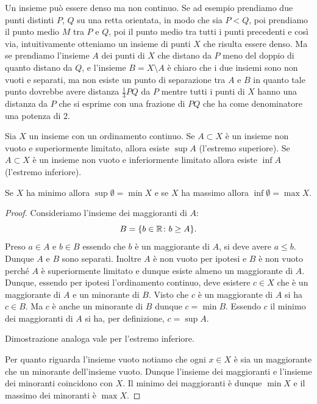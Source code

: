 \begin{example}
Un insieme può essere denso ma non continuo. 
Se ad esempio prendiamo due punti distinti $P$, $Q$ su una retta orientata, 
in modo che sia $P<Q$, poi prendiamo il punto 
medio $M$ tra $P$ e $Q$, poi il punto medio tra tutti i punti precedenti 
e così via,
intuitivamente otteniamo un insieme di punti $X$ che risulta essere denso.
Ma se prendiamo l'insieme $A$ dei punti di $X$ che distano da $P$ 
meno del doppio di quanto distano da $Q$, 
e l'insieme $B=X\setminus A$ è chiaro che i due insiemi sono non vuoti e 
separati, ma non esiste un punto di separazione tra $A$ e $B$ in quanto 
tale punto dovrebbe avere distanza $\frac 1 3 PQ$ da $P$ mentre tutti i punti 
di $X$ hanno una distanza da $P$ che si esprime con una frazione di $PQ$ 
che ha come denominatore una potenza di $2$.
\end{example}


\begin{theorem}%
  \label{th:sup}%
  \mymark{**}%
  Sia $X$ un insieme con un ordinamento continuo.
  Se $A\subset X$ è un insieme non vuoto
  e superiormente limitato, allora esiste $\sup A$ (l'estremo superiore).
  Se $A\subset X$ è un insieme non vuoto e inferiormente limitato 
  allora esiste $\inf A$ (l'estremo inferiore).

  Se $X$ ha minimo allora $\sup\emptyset = \min X$
  e se $X$ ha massimo allora $\inf\emptyset = \max X$.
  \end{theorem}
  \begin{proof}
  \mymark{*}
  Consideriamo l'insieme dei maggioranti di $A$:
  \[
  B = {\left\{  b\in {\mathbb R} \colon b \ge A \right\}}.
  \]
  Preso $a\in A$ e $b\in B$ essendo che $b$ è un maggiorante di $A$,
  si deve avere $a\le b$. Dunque $A$ e $B$ sono separati.
  Inoltre $A$ è non vuoto per ipotesi e $B$ è non vuoto perché 
  $A$ è superiormente limitato e dunque esiste almeno un maggiorante di $A$.
  Dunque, essendo per ipotesi l'ordinamento continuo,
  deve esistere $c\in X$ che è un maggiorante di $A$ e un minorante di $B$.
  Visto che $c$ è un maggiorante di $A$ si ha $c\in B$.
  Ma $c$ è anche un minorante di $B$ dunque $c=\min B$.
  Essendo $c$ il minimo dei maggioranti di $A$ si ha, per definizione,
  $c= \sup A$.

  Dimostrazione analoga vale per l'estremo inferiore.

  Per quanto riguarda l'insieme vuoto notiamo che ogni $x\in X$ 
  è sia un maggiorante che un minorante dell'insieme vuoto.
  Dunque l'insieme dei maggioranti e l'insieme dei minoranti coincidono con $X$.
  Il minimo dei maggioranti è dunque $\min X$ e il massimo dei minoranti è $\max X$.
\end{proof}


